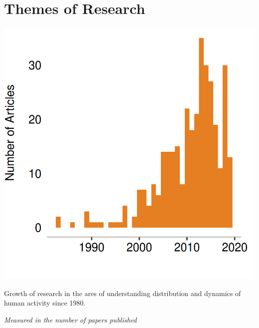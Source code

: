 \section{Themes of Research}

\begin{marginfigure}
  \includegraphics{images/literature-timeline.png}
  \caption{Growth of research in the ares of understanding distribution and dynamics of human activity since 1980.}
  \label{figure:literature:timeline}
  \vspace{1em}
  \noindent\fontsize{7}{7}\textit{Measured in the number of papers published}
\end{marginfigure}

